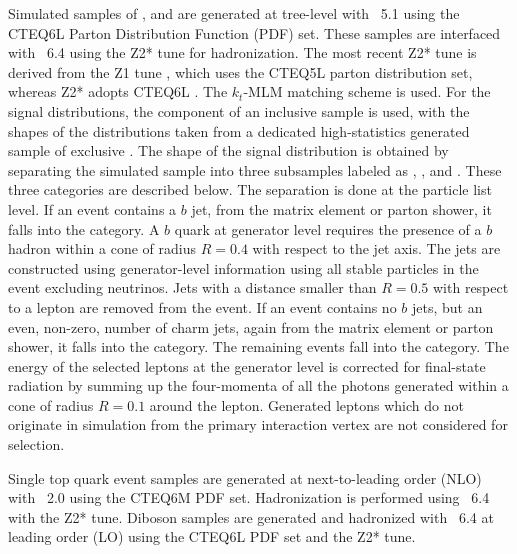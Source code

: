 Simulated samples of \vjets, \gjets
 and  \ttjets are generated at tree-level with
 \textsc{\MADGRAPH~5.1} \cite {Alwall:2011uj,ref:MadEvent} %
 using the CTEQ6L \cite {ref:CTEQ66} Parton Distribution Function (PDF) set.
These samples are interfaced with
 \textsc{\PYTHIA~6.4} \cite {Sjostrand:2006za} using the Z2* tune
 for hadronization.
The most recent \textsc{\PYTHIA} Z2* tune is derived from the Z1 tune \cite {Field:2010bc},
 which uses the CTEQ5L parton distribution set, whereas Z2* adopts CTEQ6L \cite {ref:CTEQ66}.
The $k_t$-MLM \cite {Alwall:2007fs,Alwall:2008qv} matching scheme is used.
For the signal distributions, the \wbb component of
 an inclusive \wjets sample is used,
 with the shapes of the distributions taken
 from a dedicated high-statistics generated sample of exclusive \wbb.
The shape of the \wbb signal distribution is obtained by separating
 the \wjets simulated sample into three subsamples labeled as \wbb, \wcc, and \wudscg.
These three categories are described below.
The separation is done at the particle list level.
If an event contains a $b$ jet, from the matrix element or parton shower,
 it falls into the \wbb category.
A $b$ quark at generator level requires
 the presence of a $b$ hadron within a cone of
 radius $R=0.4$ with respect to the jet axis.
The jets are constructed using generator-level information using
 all stable particles in the event excluding neutrinos.
Jets with a distance smaller than $R = 0.5$ with respect to a
 lepton are removed from the event.
If an event contains no $b$ jets, but
 an even, non-zero, number of charm jets,
 again from the matrix element or
 parton shower, it falls into the \wcc category.
The remaining events fall into the \wudscg category.
The energy of the selected leptons at the generator level is corrected
 for final-state radiation by summing up
 the four-momenta of
 all the photons generated within a cone of radius $R = 0.1$
 around the lepton.
Generated leptons which do not originate in simulation
 from the primary interaction vertex are not considered for selection.

Single top quark event samples are generated at next-to-leading order (NLO) with
 \textsc{\POWHEG~2.0} \cite {Nason:2004rx,Frixione:2007vw,ref:POWHEG_T_SandTchannel,ref:POWHEG_T_tWchannel}
 using the CTEQ6M PDF set.
Hadronization is performed using
 \textsc{\PYTHIA~6.4} with the Z2* tune.
Diboson samples are generated and hadronized
 with \textsc{\PYTHIA~6.4} at leading order (LO)
 using the CTEQ6L PDF set and the Z2* tune.

